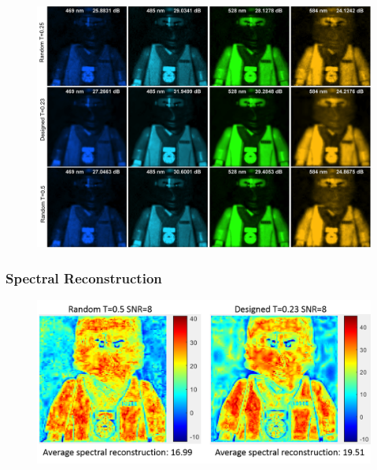 \documentclass{beamer}
\begin{document}

\begin{frame}

\begin{figure}
\centering
\includegraphics[scale=0.3]{FiguresUpd/Sim_all.png}
\end{figure}
\end{frame}


\begin{frame}
\frametitle{Spectral Reconstruction}

\begin{figure}
\centering
\includegraphics[scale=0.5]{FiguresUpd/spectral.png}
\end{figure}
\end{frame}
\end{document}
